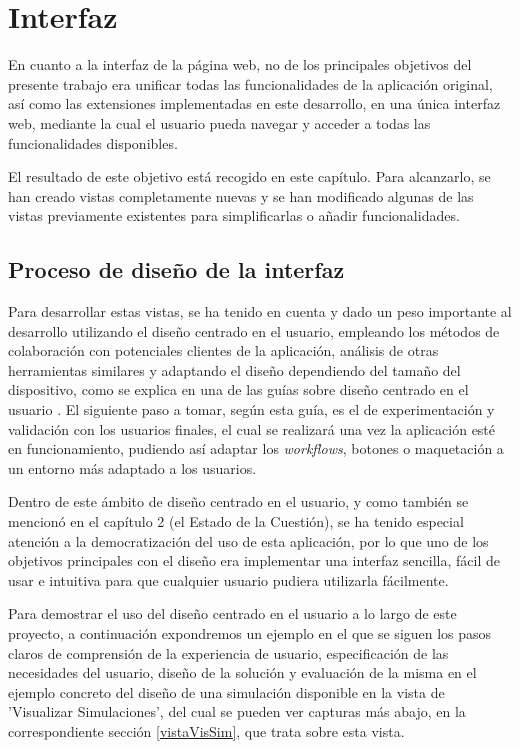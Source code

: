 \chapter{Interfaz}
\label{cap:interfaz}

En cuanto a la interfaz de la página web, no de los principales objetivos del presente trabajo era unificar todas las funcionalidades de la aplicación original, así como las extensiones implementadas en este desarrollo, en una única interfaz web, mediante la cual el usuario pueda navegar y acceder a todas las funcionalidades disponibles.

El resultado de este objetivo está recogido en este capítulo. Para alcanzarlo, se han creado vistas completamente nuevas y se han modificado algunas de las vistas previamente existentes para simplificarlas o añadir funcionalidades.

\section{Proceso de diseño de la interfaz}

Para desarrollar estas vistas, se ha tenido en cuenta y dado un peso importante al desarrollo utilizando el diseño centrado en el usuario, empleando los métodos de colaboración con potenciales clientes de la aplicación, análisis de otras herramientas similares y adaptando el diseño dependiendo del tamaño del dispositivo, como se explica en una de las guías sobre diseño centrado en el usuario \citep{pratt2012interactive}. El siguiente paso a tomar, según esta guía, es el de experimentación y validación con los usuarios finales, el cual se realizará una vez la aplicación esté en funcionamiento, pudiendo así adaptar los \textit{workflows}, botones o maquetación a un entorno más adaptado a los usuarios.

Dentro de este ámbito de diseño centrado en el usuario, y como también se mencionó en el capítulo 2 (el Estado de la Cuestión), se ha tenido especial atención a la democratización del uso de esta aplicación, por lo que uno de los objetivos principales con el diseño era implementar una interfaz sencilla, fácil de usar e intuitiva para que cualquier usuario pudiera utilizarla fácilmente.

Para demostrar el uso del diseño centrado en el usuario a lo largo de este proyecto, a continuación expondremos un ejemplo en el que se siguen los pasos claros de comprensión de la experiencia de usuario, especificación de las necesidades del usuario, diseño de la solución y evaluación de la misma en el ejemplo concreto del diseño de una simulación disponible en la vista de 'Visualizar Simulaciones', del cual se pueden ver capturas más abajo, en la correspondiente sección \ref{vistaVisSim}, que trata sobre esta vista.

